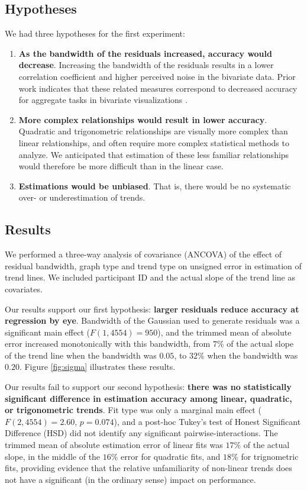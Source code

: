 \documentclass{sigchi}
\begin{document}
\subsection{Hypotheses}

We had three hypotheses for the first experiment:
\begin{enumerate}
	\item \textbf{As the bandwidth of the residuals increased, accuracy would decrease}. Increasing the bandwidth of the residuals results in a lower correlation coefficient and higher perceived noise in the bivariate data. Prior work indicates that these related measures correspond to decreased accuracy for aggregate tasks in bivariate visualizations \cite{albers2014task,harrison2014ranking}.
	\item \textbf{More complex relationships would result in lower accuracy}. Quadratic and trigonometric relationships are visually more complex than linear relationships, and often require more complex statistical methods to analyze. We anticipated that estimation of these less familiar relationships would therefore be more difficult than in the linear case.
	\item \textbf{Estimations would be unbiased}. That is, there would be no systematic over- or underestimation of trends.
\end{enumerate}
\subsection{Results}
We performed a three-way analysis of covariance (ANCOVA) of the effect of residual bandwidth, graph type and trend type on unsigned error in estimation of trend lines. We included participant ID and the actual slope of the trend line as covariates.

Our results support our first hypothesis: \textbf{larger residuals reduce accuracy at regression by eye}. Bandwidth of the Gaussian used to generate residuals was a significant main effect ($F(1,4554)=950$), and the trimmed mean of absolute error increased monotonically with this bandwidth, from $7\%$ of the actual slope of the trend line when the bandwidth was $0.05$, to $32\%$ when the bandwidth was $0.20$. Figure \ref{fig:sigma} illustrates these results.

Our results fail to support our second hypothesis: \textbf{there was no statistically significant difference in estimation accuracy among linear, quadratic, or trigonometric trends}. Fit type was only a marginal main effect ($F(2,4554)=2.60$, $p=0.074$), and a post-hoc Tukey's test of Honest Significant Difference (HSD) did not identify any significant pairwise-interactions. The trimmed mean of absolute estimation error of linear fits was $17\%$ of the actual slope, in the middle of the $16\%$ error for quadratic fits, and $18\%$ for trignometric fits, providing evidence that the relative unfamiliarity of non-linear trends does not have a significant (in the ordinary sense) impact on performance.
\end{document}
